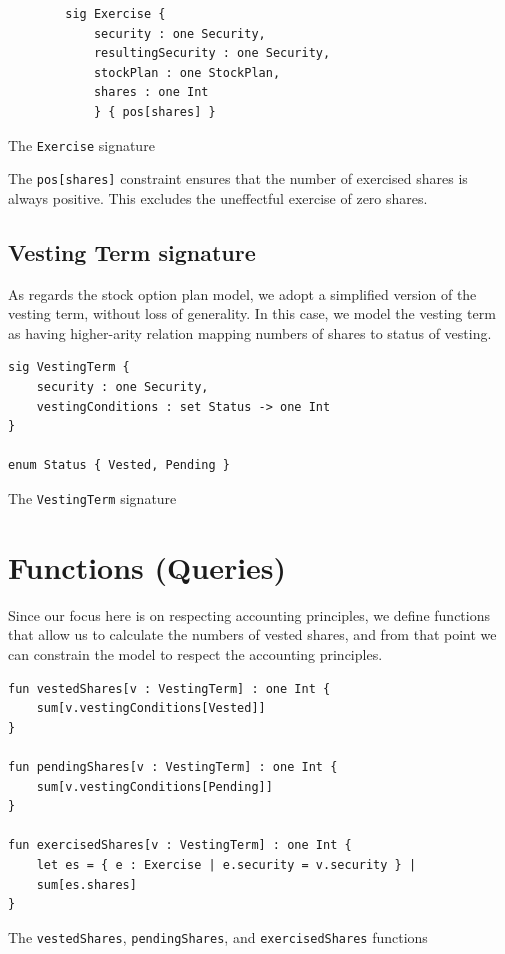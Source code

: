 \begin{listing}[!h]
\begin{verbatim}
		sig Exercise {
			security : one Security,
			resultingSecurity : one Security,
			stockPlan : one StockPlan,
			shares : one Int
			} { pos[shares] }
\end{verbatim}
\caption{The \texttt{Exercise} signature}
\label{lst:exercise-signature-2}
\end{listing}


The \verb|pos[shares]| constraint ensures that the number of exercised shares is always positive. This excludes the uneffectful exercise of zero shares.

\subsection{Vesting Term signature}

As regards the stock option plan model, we adopt a simplified version of the vesting term, without loss of generality. In this case, we model the vesting term as having higher-arity relation mapping numbers of shares to status of vesting. 

\begin{listing}[!h]
\begin{verbatim}
sig VestingTerm {
    security : one Security,
    vestingConditions : set Status -> one Int
}

enum Status { Vested, Pending }
\end{verbatim}
\caption{The \texttt{VestingTerm} signature}
\label{lst:vesting-term-signature-2}
\end{listing}


\section{Functions (Queries)}

Since our focus here is on respecting accounting principles, we define functions that allow us to calculate the numbers of vested shares, and from that point we can constrain the model to respect the accounting principles.

\begin{listing}[!h]
\begin{verbatim}
fun vestedShares[v : VestingTerm] : one Int {
    sum[v.vestingConditions[Vested]]
}

fun pendingShares[v : VestingTerm] : one Int {
    sum[v.vestingConditions[Pending]]
}

fun exercisedShares[v : VestingTerm] : one Int {
    let es = { e : Exercise | e.security = v.security } |
    sum[es.shares]
}
\end{verbatim}
\caption{The \texttt{vestedShares}, \texttt{pendingShares}, and \texttt{exercisedShares} functions}
\label{lst:vested-shares-function-2}
\end{listing}


